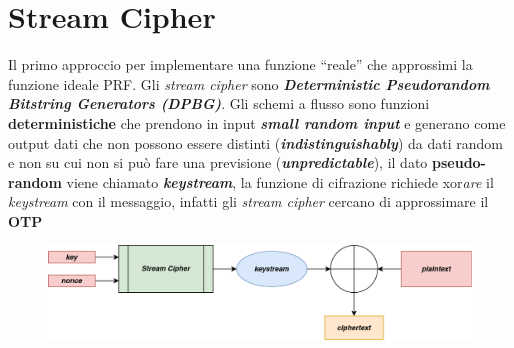 \section{Stream Cipher}
Il primo approccio per implementare una funzione ``reale'' che approssimi la funzione ideale PRF. Gli \textit{stream cipher} sono \textbf{\textit{Deterministic Pseudorandom Bitstring Generators (DPBG)}}. Gli schemi a flusso sono funzioni \textbf{deterministiche} che prendono in input \textbf{\textit{small random input}} e generano come output dati che non possono essere distinti (\textbf{\textit{indistinguishably}}) da dati random e non su cui non si può fare una previsione (\textbf{\textit{unpredictable}}), il dato \textbf{pseudo-random} viene chiamato \textbf{\textit{keystream}}, la funzione di cifrazione richiede xor\textit{are} il \textit{keystream} con il messaggio, infatti gli \textit{stream cipher} cercano di approssimare il \textbf{OTP}

\begin{figure}[h]
    \centering
    \includegraphics[width=\textwidth]{img/stream_cipher}
    \label{fig:stream_cipher}
\end{figure}

